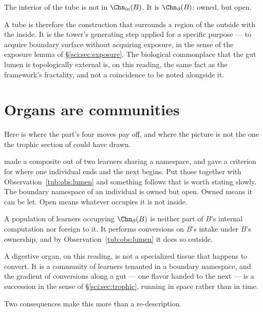 \begin{observation}
\label{tub:obs:lumen}
The interior of the tube is not in $\Chn_{\mathrm{in}}(B)$. It is
$\Chn_{\partial}(B)$: owned, but open.
\end{observation}

A tube is therefore the construction that surrounds a region of the outside with
the inside. It is the tower's generating step applied for a specific purpose ---
to acquire boundary surface without acquiring exposure, in the sense of the
exposure lemma of \S\ref{sci:sec:exposure}. The biological commonplace that the
gut lumen is topologically external \cite{stevenshume1995} is, on this reading,
the same fact as the framework's fractality, and not a coincidence to be noted
alongside it.

\section{Organs are communities}
\label{tub:sec:organs}

Here is where the part's four moves pay off, and where the picture is not the
one the trophic section of \chSci could have drawn.

\chComp made a composite out of two learners sharing a namespace, and \chEng
gave a criterion for where one individual ends and the next begins. Put those
together with Observation~\ref{tub:obs:lumen} and something follows that is
worth stating slowly. The boundary namespace of an individual is owned but open.
Owned means it can be let. Open means whatever occupies it is not inside.

\begin{observation}
\label{tub:obs:let}
A population of learners occupying $\Chn_{\partial}(B)$ is neither part of $B$'s
internal computation nor foreign to it. It performs conversions on $B$'s intake
under $B$'s ownership, and by Observation~\ref{tub:obs:lumen} it does so
outside.
\end{observation}

A digestive organ, on this reading, is not a specialized tissue that happens to
convert. It is a community of learners tenanted in a boundary namespace, and the
gradient of conversions along a gut --- one flavor handed to the next --- is a
succession in the sense of \S\ref{sci:sec:trophic}, running in space rather than
in time.

Two consequences make this more than a re-description.

